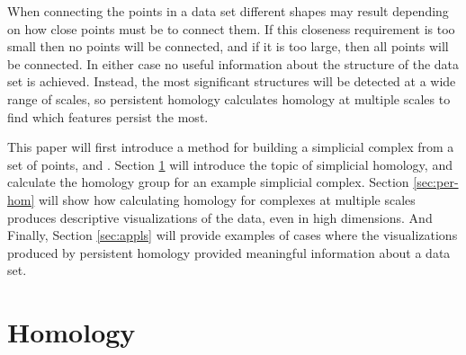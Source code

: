 When connecting the points in a data set different shapes may result depending on how close points must be to connect them.
If this closeness requirement is too small then no points will be connected, and if it is too large, then all points will be connected.
In either case no useful information about the structure of the data set is achieved.
Instead, the most significant structures will be detected at a wide range of scales, so persistent homology calculates homology at multiple scales to find which features persist the most.

This paper will first introduce a method for building a simplicial complex from a set of points, and .
Section \ref{sec:homology} will introduce the topic of simplicial homology, and calculate the homology group for an example simplicial complex.
Section \ref{sec:per-hom} will show how calculating homology for complexes at multiple scales produces descriptive visualizations of the data, even in high dimensions. And Finally, Section \ref{sec:appls} will provide examples of cases where the visualizations produced by persistent homology provided meaningful information about a data set.


%     


\section{Homology}\label{sec:homology}


